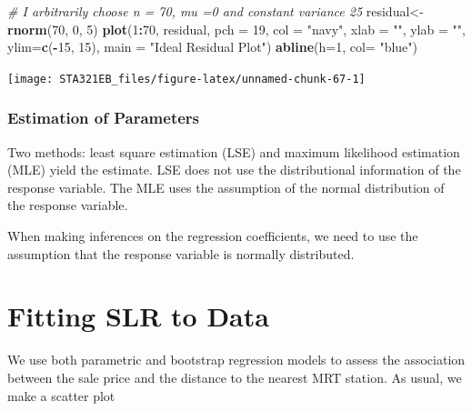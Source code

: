 \documentclass[
]{book}
\newenvironment{Shaded}{\begin{snugshade}}{\end{snugshade}}
\newcommand{\AttributeTok}[1]{\textcolor[rgb]{0.13,0.29,0.53}{#1}}
\newcommand{\CommentTok}[1]{\textcolor[rgb]{0.56,0.35,0.01}{\textit{#1}}}
\newcommand{\DecValTok}[1]{\textcolor[rgb]{0.00,0.00,0.81}{#1}}
\newcommand{\FunctionTok}[1]{\textcolor[rgb]{0.13,0.29,0.53}{\textbf{#1}}}
\newcommand{\NormalTok}[1]{#1}
\newcommand{\OtherTok}[1]{\textcolor[rgb]{0.56,0.35,0.01}{#1}}
\newcommand{\SpecialCharTok}[1]{\textcolor[rgb]{0.81,0.36,0.00}{\textbf{#1}}}
\newcommand{\StringTok}[1]{\textcolor[rgb]{0.31,0.60,0.02}{#1}}
\begin{document}
\begin{Shaded}
\begin{Highlighting}[]
\CommentTok{\# I arbitrarily choose n = 70, mu =0 and constant variance 25}
\NormalTok{residual}\OtherTok{\textless{}{-}} \FunctionTok{rnorm}\NormalTok{(}\DecValTok{70}\NormalTok{, }\DecValTok{0}\NormalTok{, }\DecValTok{5}\NormalTok{)  }
\FunctionTok{plot}\NormalTok{(}\DecValTok{1}\SpecialCharTok{:}\DecValTok{70}\NormalTok{, residual, }\AttributeTok{pch =} \DecValTok{19}\NormalTok{, }\AttributeTok{col =} \StringTok{"navy"}\NormalTok{, }
     \AttributeTok{xlab =} \StringTok{""}\NormalTok{, }\AttributeTok{ylab =} \StringTok{""}\NormalTok{,}
     \AttributeTok{ylim=}\FunctionTok{c}\NormalTok{(}\SpecialCharTok{{-}}\DecValTok{15}\NormalTok{, }\DecValTok{15}\NormalTok{),}
     \AttributeTok{main =} \StringTok{"Ideal Residual Plot"}\NormalTok{)}
\FunctionTok{abline}\NormalTok{(}\AttributeTok{h=}\DecValTok{1}\NormalTok{, }\AttributeTok{col=} \StringTok{"blue"}\NormalTok{)}
\end{Highlighting}
\end{Shaded}

\begin{center}\texttt{[image: STA321EB\_files/figure-latex/unnamed-chunk-67-1]} \end{center}

\hypertarget{estimation-of-parameters}{%
\subsubsection{Estimation of Parameters}\label{estimation-of-parameters}}

Two methods: least square estimation (LSE) and maximum likelihood estimation (MLE) yield the estimate. LSE does not use the distributional information of the response variable. The MLE uses the assumption of the normal distribution of the response variable.

When making inferences on the regression coefficients, we need to use the assumption that the response variable is normally distributed.

\hypertarget{fitting-slr-to-data}{%
\section{Fitting SLR to Data}\label{fitting-slr-to-data}}

We use both parametric and bootstrap regression models to assess the association between the sale price and the distance to the nearest MRT station. As usual, we make a scatter plot
\end{document}
